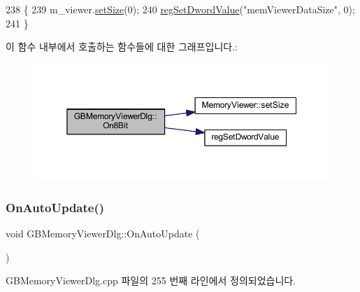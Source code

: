 \begin{DoxyCode}
238 \{
239   m\_viewer.\mbox{\hyperlink{class_memory_viewer_a185cb06e604ff1e0016b9be859c21387}{setSize}}(0);
240   \mbox{\hyperlink{_reg_8cpp_a758e775489a3fb5c3cc7071fdd5af87e}{regSetDwordValue}}(\textcolor{stringliteral}{"memViewerDataSize"}, 0);
241 \}
\end{DoxyCode}
이 함수 내부에서 호출하는 함수들에 대한 그래프입니다.\+:
\nopagebreak
\begin{figure}[H]
\begin{center}
\leavevmode
\includegraphics[width=350pt]{class_g_b_memory_viewer_dlg_a3e6f7abe8cf8dbc567d662eb33cf569b_cgraph}
\end{center}
\end{figure}
\mbox{\label{class_g_b_memory_viewer_dlg_a7c7da28ae22f8a9f5f8ad3e6bb358949}} 
\subsubsection{\texorpdfstring{On\+Auto\+Update()}{OnAutoUpdate()}}
{\footnotesize\ttfamily void G\+B\+Memory\+Viewer\+Dlg\+::\+On\+Auto\+Update (\begin{DoxyParamCaption}{ }\end{DoxyParamCaption})\hspace{0.3cm}{\ttfamily [protected]}}



G\+B\+Memory\+Viewer\+Dlg.\+cpp 파일의 255 번째 라인에서 정의되었습니다.


